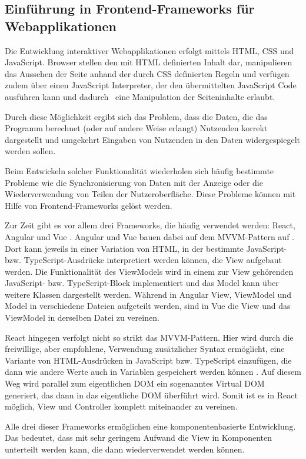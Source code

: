 \subsection{Einführung in Frontend-Frameworks für Webapplikationen}
Die Entwicklung interaktiver Webapplikationen erfolgt mittels HTML, CSS und JavaScript. Browser stellen den mit HTML definierten Inhalt dar, manipulieren das Aussehen der Seite anhand der durch CSS definierten Regeln und verfügen zudem über einen JavaScript Interpreter, der den übermittelten JavaScript Code ausführen kann und dadurch~ eine Manipulation der Seiteninhalte erlaubt.

Durch diese Möglichkeit ergibt sich das Problem, dass die Daten, die das Programm berechnet (oder auf andere Weise erlangt) Nutzenden korrekt dargestellt und umgekehrt Eingaben von Nutzenden in den Daten widergespiegelt werden sollen.

Beim Entwickeln solcher Funktionalität wiederholen sich häufig bestimmte Probleme wie die Synchronisierung von Daten mit der Anzeige oder die Wiederverwendung von Teilen der Nutzeroberfläche. Diese Probleme können mit Hilfe von Frontend-Frameworks gelöst werden.

Zur Zeit gibt es vor allem drei Frameworks, die häufig verwendet werden: React, Angular und Vue \cite{stateofjs}. Angular und Vue bauen dabei auf dem \gls{MVVM}-Pattern auf \cite{angular_mvvm}. Dort kann jeweils in einer Variation von HTML, in der bestimmte JavaScript- bzw. TypeScript-Ausdrücke interpretiert werden können, die View aufgebaut werden. Die Funktionalität des ViewModels wird in einem zur View gehörenden JavaScript- bzw. TypeScript-Block implementiert und das Model kann über weitere Klassen dargestellt werden. Während in Angular View, ViewModel und Model in verschiedene Dateien aufgeteilt werden, sind in Vue die View und das ViewModel in derselben Datei zu vereinen.

React hingegen verfolgt nicht so strikt das \gls{MVVM}-Pattern. Hier wird durch die freiwillige, aber empfohlene, Verwendung zusätzlicher Syntax ermöglicht, eine Variante von HTML-Ausdrücken in JavaScript bzw. TypeScript einzufügen, die dann wie andere Werte auch in Variablen gespeichert werden können \cite{react_jsx}. Auf diesem Weg wird parallel zum eigentlichen \gls{DOM} ein sogenanntes Virtual \gls{DOM} generiert, das dann in das eigentliche \gls{DOM} überführt wird. Somit ist es in React möglich, View und Controller komplett miteinander zu vereinen.

Alle drei dieser Frameworks ermöglichen eine komponentenbasierte Entwicklung. Das bedeutet, dass mit sehr geringem Aufwand die View in Komponenten unterteilt werden kann, die dann wiederverwendet werden können.


